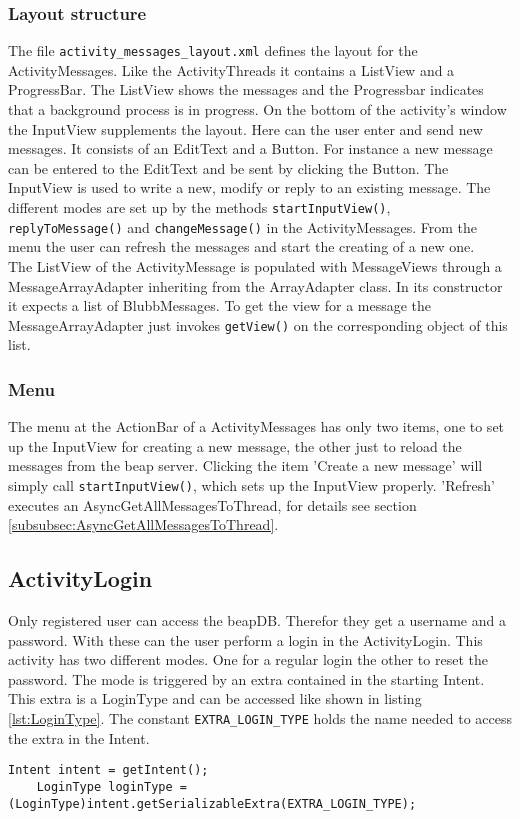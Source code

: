 \documentclass[12pt,a4paper,oneside]{report}
\newcommand{\code}[1]{\lstinline{#1}}
\begin{document}
\subsubsection{Layout structure}
The file \code{activity_messages_layout.xml} defines the layout for the ActivityMessages. Like the ActivityThreads it contains a ListView and a ProgressBar. The ListView shows the messages and the Progressbar indicates that a background process is in progress. On the bottom of the activity's window the InputView supplements the layout. Here can the user enter and send new messages. It consists of an EditText and a Button. For instance a new message can be entered to the EditText and be sent by clicking the Button. 
The InputView is used to write a new, modify or reply to an existing message. The different modes are set up by the methods \code{startInputView()}, \code{ replyToMessage()} and \code{changeMessage()} in the ActivityMessages.
From the menu the user can refresh the messages and start the creating of a new one. \\



The ListView of the ActivityMessage is populated with MessageViews through a MessageArrayAdapter inheriting from the ArrayAdapter class. 
In its constructor it expects a list of BlubbMessages. To get the view for a message the MessageArrayAdapter just invokes \code{getView()} on the corresponding object of this list. 

\subsubsection{Menu}
The menu at the ActionBar of a ActivityMessages has only two items, one to set up the InputView for creating a new message, the other just to reload the messages from the beap server. Clicking the item 'Create a new message' will simply call \code{startInputView()}, which sets up the InputView properly. 'Refresh' executes an AsyncGetAllMessagesToThread, for details see section  \ref{subsubsec:AsyncGetAllMessagesToThread}.

\subsection{ActivityLogin}
Only registered user can access the beapDB. Therefor they get a username and a password. With these can the user perform a login in the ActivityLogin. This activity has two different modes. One for a regular login the other to reset the password. The mode is triggered by an extra contained in the starting Intent. This extra is a LoginType and can be accessed like shown in listing \ref{lst:LoginType}. The constant \code{EXTRA_LOGIN_TYPE} holds the name needed to access the extra in the Intent.
\lstset{language=java}
\begin{lstlisting}[caption=Accessing the LoginType., label=lst:LoginType]
	Intent intent = getIntent();
    LoginType loginType = (LoginType)intent.getSerializableExtra(EXTRA_LOGIN_TYPE);
\end{lstlisting}
\end{document}
